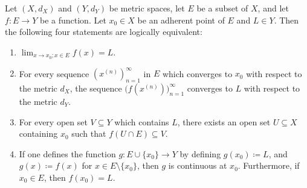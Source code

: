 \begin{prop}\label{3.1.5}
  Let \((X, d_X)\) and \((Y, d_Y)\) be metric spaces, let \(E\) be a subset of \(X\), and let \(f : E \to Y\) be a function.
  Let \(x_0 \in X\) be an adherent point of \(E\) and \(L \in Y\).
  Then the following four statements are logically equivalent:
  \begin{enumerate}
    \item \(\lim_{x \to x_0 ; x \in E} f(x) = L\).
    \item For every sequence \((x^{(n)})_{n = 1}^\infty\) in \(E\) which converges to \(x_0\) with respect to the metric \(d_X\), the sequence \(\big(f(x^{(n)})\big)_{n = 1}^\infty\) converges to \(L\) with respect to the metric \(d_Y\).
    \item For every open set \(V \subseteq Y\) which contains \(L\), there exists an open set \(U \subseteq X\) containing \(x_0\) such that \(f(U \cap E) \subseteq V\).
    \item If one defines the function \(g : E \cup \{x_0\} \to Y\) by defining \(g(x_0) \coloneqq L\), and \(g(x) \coloneqq f(x)\) for \(x \in E \setminus \{x_0\}\), then \(g\) is continuous at \(x_0\).
          Furthermore, if \(x_0 \in E\), then \(f(x_0) = L\).
  \end{enumerate}
\end{prop}

